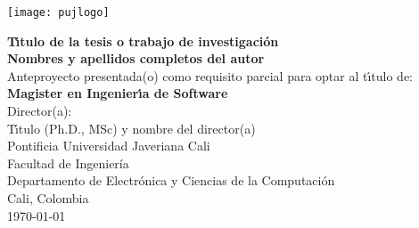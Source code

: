 \begin{center}
\thispagestyle{empty}
\vspace*{0cm}
\begin{center}
    \texttt{[image: pujlogo]}~\\[1.75cm]
\end{center}
\textbf{\huge
T\'{\i}tulo de la tesis  o trabajo de investigación}\\[1.75cm]
\Large\textbf{Nombres y apellidos completos del autor}\\[1.5cm]
\small Anteproyecto presentada(o) como requisito parcial para optar al
t\'{\i}tulo de:\\
\textbf{Magister en Ingenier\'{\i}a de Software}\\[1.5cm]
Director(a):\\
T\'{\i}tulo (Ph.D., MSc) y nombre del director(a)\\[1.6cm]

Pontificia Universidad Javeriana Cali\\
Facultad de Ingeniería\\
Departamento de Electrónica y Ciencias de la Computación\\
Cali, Colombia\\
\today\\
\end{center}

